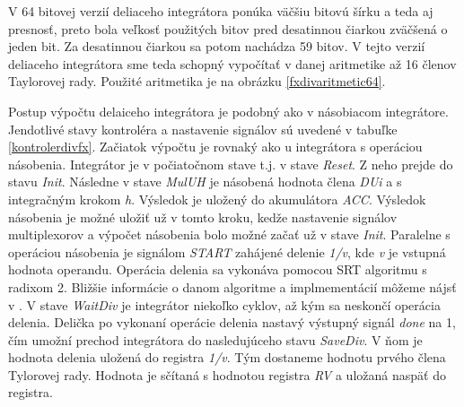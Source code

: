 V 64 bitovej verzií deliaceho integrátora ponúka väčšiu bitovú šírku a teda aj presnosť, preto bola veľkosť použitých bitov pred desatinnou čiarkou zväčšená o jeden bit. Za desatinnou čiarkou sa potom nachádza 59 bitov. V tejto verzií deliaceho integrátora sme teda schopný vypočítať v danej aritmetike až 16 členov Taylorovej rady. Použité aritmetika je na obrázku \ref{fxdivaritmetic64}.

Postup výpočtu delaiceho integrátora je podobný ako v násobiacom integrátore. Jendotlivé stavy kontroléra a nastavenie signálov sú uvedené v tabuľke \ref{kontrolerdivfx}. Začiatok výpočtu je rovnaký ako u integrátora s operáciou násobenia. Integrátor je v počiatočnom stave t.j. v stave \textit{Reset}. Z neho prejde do stavu \textit{Init}. Následne v stave \textit{MulUH} je násobená hodnota člena \textit{DUi} a s integračným krokom \textit{h}. Výsledok je uložený do akumulátora \textit{ACC}. Výsledok násobenia je možné uložiť už v tomto kroku, kedže nastavenie signálov multiplexorov a výpočet násobenia bolo možné začať už v stave \textit{Init}. Paralelne s operáciou násobenia je signálom \textit{START} zahájené delenie \textit{1/v}, kde \textit{v} je vstupná hodnota operandu. Operácia delenia sa vykonáva pomocou SRT algoritmu s radixom 2. Bližšie informácie o danom algoritme a implmementácií môžeme nájsť v \cite{MatecnyBP}. V stave \textit{WaitDiv} je integrátor niekoľko cyklov, až kým sa neskončí operácia delenia. Delička po vykonaní operácie delenia nastavý výstupný signál \textit{done} na 1, čím umožní prechod integrátora do nasledujúceho stavu \textit{SaveDiv}. V ňom je hodnota delenia uložená do registra \textit{1/v}. Tým dostaneme hodnotu prvého člena Tylorovej rady. Hodnota je sčítaná s hodnotou registra \textit{RV} a uložaná naspäť do registra.



